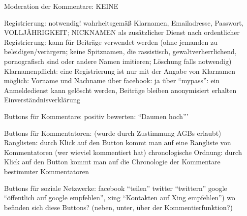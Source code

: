 Moderation der Kommentare: KEINE




Registrierung:  notwendig! wahrheitsgemäß Klarnamen, Emailadresse, Passwort, VOLLJÄHRIGKEIT; NICKNAMEN als zusätzlicher Dienst nach ordentlicher Registrierung: kann für Beiträge verwendet werden (ohne jemanden zu beleidigen/verärgern; keine Spitznamen, die rassistisch, gewaltverherrlichend, pornografisch sind oder andere Namen imitieren; Löschung falls notwendig)
	 Klarnamenpflicht: eine Registrierung ist nur mit der Angabe von Klarnamen möglich: Vorname und Nachname
	 über facebook: ja
	 über ``mypass'': ein Anmeldedienst 	
	 kann gelöscht werden, Beiträge bleiben anonymisiert erhalten
	 Einverständnisverklärung
	 

Buttons für Kommentare: 
	positiv bewerten: ``Daumen hoch'''
	
	

Buttons für Kommentatoren:  (wurde durch Zustimmung AGBs erlaubt)
	Ranglisten: durch Klick auf den Button kommt man auf eine Rangliste von Kommentatoren (wer wieviel kommentiert hat)
	chronologische Ordnung: durch Klick auf den Button kommt man auf die Chronologie der Kommentare bestimmter Kommentatoren

Buttons für soziale Netzwerke:
	facebook ``teilen''
	twitter ``twittern''
	google ``öffentlich auf google empfehlen'', 
	xing ``Kontakten auf Xing empfehlen'')
	wo befinden sich diese Buttons? (neben, unter, über der Kommentierfunktion?)

